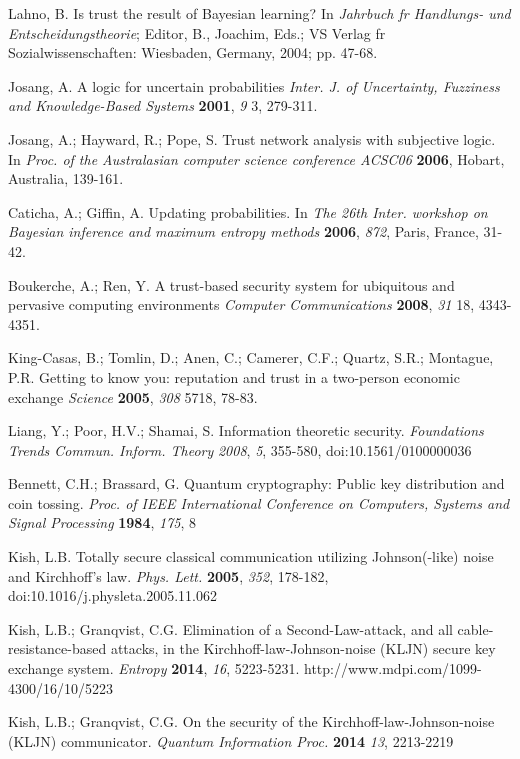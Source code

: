 \documentclass{ws-fnl2}
\begin{document}
\begin{thebibliography}{99}
Lahno, B. Is trust the result of Bayesian learning? In {\em Jahrbuch fr Handlungs- und Entscheidungstheorie}; Editor, B., Joachim, Eds.; VS Verlag fr Sozialwissenschaften: Wiesbaden, Germany, 2004; pp. 47-68.

Josang, A. A logic for uncertain probabilities {\em Inter. J. of Uncertainty, Fuzziness and Knowledge-Based Systems} {\bf 2001}, {\em 9} 3, 279-311.

Josang, A.; Hayward, R.; Pope, S. Trust network analysis with subjective logic. In {\em Proc. of the Australasian computer science conference ACSC06} {\bf 2006}, Hobart, Australia, 139-161.

Caticha, A.; Giffin, A. Updating probabilities. In {\em The 26th Inter. workshop on Bayesian inference and maximum entropy methods} {\bf 2006}, {\em 872}, Paris, France, 31-42.

Boukerche, A.; Ren, Y. A trust-based security system for ubiquitous and pervasive computing environments {\em Computer Communications} {\bf 2008}, {\em 31} 18, 4343-4351.

King-Casas, B.; Tomlin, D.; Anen, C.; Camerer, C.F.; Quartz, S.R.; Montague, P.R. Getting to know you: reputation and trust in a two-person economic exchange {\em Science} {\bf 2005}, {\em 308} 5718, 78-83.





Liang, Y.; Poor, H.V.; Shamai, S. Information theoretic security. {\em Foundations Trends Commun. Inform. Theory} {\em 2008}, {\em 5}, 355-580, doi:10.1561/0100000036


Bennett, C.H.; Brassard, G. Quantum cryptography: Public key distribution and coin tossing. {\em Proc. of IEEE International Conference on Computers, Systems and Signal Processing} {\bf 1984}, {\em 175}, 8


Kish, L.B. Totally secure classical communication utilizing Johnson(-like) noise and Kirchhoff's law. {\em Phys. Lett.} {\bf 2005}, {\em 352}, 178-182, doi:10.1016/j.physleta.2005.11.062

Kish, L.B.; Granqvist, C.G. Elimination of a Second-Law-attack, and all cable-resistance-based attacks, in the Kirchhoff-law-Johnson-noise (KLJN) secure key exchange system. {\em Entropy} {\bf 2014}, {\em 16}, 5223-5231. http://www.mdpi.com/1099-4300/16/10/5223

Kish, L.B.; Granqvist, C.G. On the security of the Kirchhoff-law-Johnson-noise (KLJN) communicator. {\em Quantum Information Proc.} {\bf 2014} {\em 13}, 2213-2219


\end{thebibliography}
\end{document}
